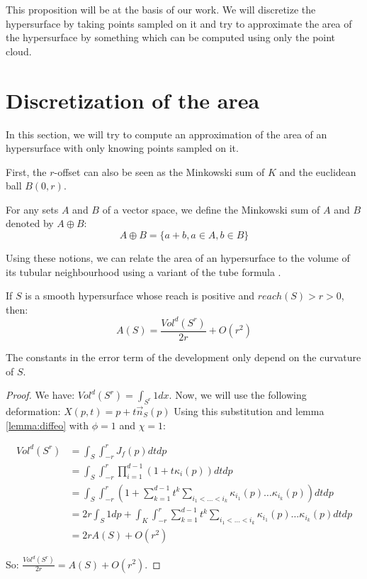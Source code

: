 This proposition will be at the basis of our work. We will discretize the
hypersurface by taking points sampled on it and try to approximate the area of
the hypersurface by something which can be computed using only the point cloud.

\section{Discretization of the area}

In this section, we will try to compute an approximation of the area of an
hypersurface with only knowing points sampled on it.

First, the $r$-offset can also be seen as the Minkowski sum of $ K $ and the
euclidean ball $ B(0, r) $.

\begin{definition}
    For any sets $ A $ and $ B $ of a vector space, we define the Minkowski sum
    of $ A $ and $ B $ denoted by $ A \oplus B $:
    $$ A \oplus B = \{ a + b, a \in A, b \in B \} $$
    \label{def:minkowski-sum}
\end{definition}

Using these notions, we can relate the area of an hypersurface to the volume of
its tubular neighbourhood using a variant of the tube formula \cite{weyl1939volume}.

\begin{proposition}
    \label{prop:comp-offset-area}
    If $ S $ is a smooth hypersurface whose reach is positive and $ reach(S) > r
    > 0 $, then:
    \begin{equation}
        A(S) = \frac{Vol^d(S^r)}{2r} + O(r^2)
    \end{equation}

    The constants in the error term of the development only depend on the curvature
    of $ S $.
\end{proposition}

\begin{proof}
    We have: $ Vol^d(S^r) = \int_{S^r} 1 dx $. Now, we will use the
    following deformation: $ X(p, t) = p + t \vec{n}_{S}(p) $ Using this
    substitution and lemma \ref{lemma:diffeo} with $ \phi = 1 $ and $ \chi = 1
    $:

    \begin{align*}
        Vol^d(S^r) &= \int_S \int_{-r}^r J_f(p) dt dp \\
        &= \int_S \int_{-r}^r \prod_{i=1}^{d-1} (1 + t \kappa_i(p)) dt dp \\
        &= \int_S \int_{-r}^r \left( 1 + \sum_{k=1}^{d-1} t^k \sum_{i_1 < \ldots
                < i_k} \kappa_{i_1}(p) \ldots \kappa_{i_k}(p) \right) dt dp \\
        &= 2r \int_S 1 dp + \int_K \int_{-r}^r \sum_{k=1}^{d-1} t^k \sum_{i_1 < \ldots < i_k} \kappa_{i_1}(p) \ldots \kappa_{i_k}(p) dt dp \\
        &= 2r A(S) + O(r^2)
    \end{align*}

    So: $ \frac{Vol^d(S^r)}{2r} = A(S) + O(r^2) $.
\end{proof}

